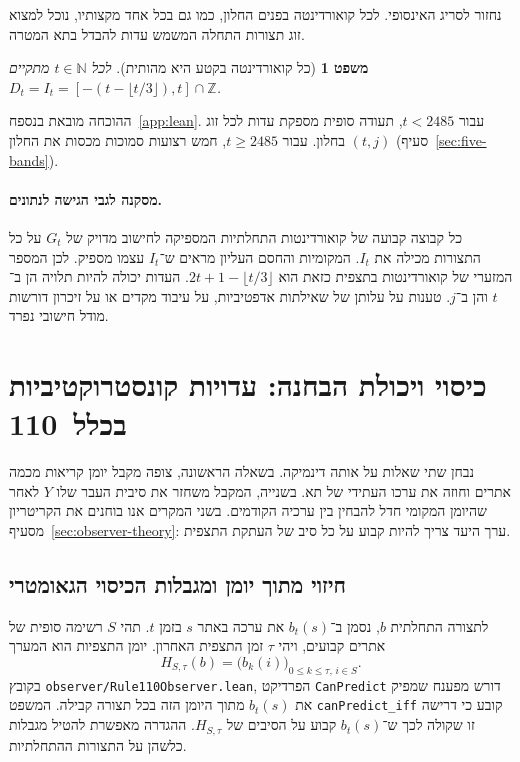 \documentclass[11pt,a4paper]{article}
\DeclareRobustCommand{\textenglish}[1]{\foreignlanguage{english}{#1}}
\newtheorem{theorem}{משפט}[section]
\theoremstyle{definition}
\begin{document}
נחזור לסריג האינסופי. לכל קואורדינטה בפנים החלון, כמו גם בכל אחד מקצותיו, נוכל למצוא זוג תצורות התחלה המשמש עדות להבדל בתא המטרה.

\begin{theorem}[כל קואורדינטה בקטע היא מהותית]\label{thm:gap-free}
לכל $t \in \mathbb{N}$ מתקיים $D_t = I_t = [-(t - \lfloor t/3 \rfloor), t] \cap \mathbb{Z}$.
\end{theorem}

ההוכחה מובאת בנספח~\ref{app:lean}. עבור $t<2485$, תעודה סופית מספקת עדות לכל זוג $(t,j)$ בחלון. עבור $t\ge2485$, חמש רצועות סמוכות מכסות את החלון (סעיף~\ref{sec:five-bands}).

\paragraph{מסקנה לגבי הגישה לנתונים.}
כל קבוצה קבועה של קואורדינטות התחלתיות המספיקה לחישוב מדויק של $G_t$ על כל התצורות מכילה את $I_t$. המקומיות והחסם העליון מראים ש־$I_t$ עצמו מספיק. לכן המספר המזערי של קואורדינטות בתצפית כזאת הוא $2t+1-\lfloor t/3\rfloor$. העדות יכולה להיות תלויה הן ב־$t$ והן ב־$j$. טענות על עלותן של שאילתות אדפטיביות, על עיבוד מקדים או על זיכרון דורשות מודל חישובי נפרד.

\section{כיסוי ויכולת הבחנה: עדויות קונסטרוקטיביות בכלל~110}
\label{sec:observer-witnesses}

נבחן שתי שאלות על אותה דינמיקה. בשאלה הראשונה, צופה מקבל יומן קריאות מכמה אתרים וחוזה את ערכו העתידי של תא. בשנייה, המקבל משחזר את סיבית העבר שלו $Y$ לאחר שהיומן המקומי חדל להבחין בין ערכיה הקודמים. בשני המקרים אנו בוחנים את הקריטריון מסעיף~\ref{sec:observer-theory}: ערך היעד צריך להיות קבוע על כל סיב של העתקת התצפית.

\subsection{חיזוי מתוך יומן ומגבלות הכיסוי הגאומטרי}
\label{sec:observer-coverage}

לתצורה התחלתית $b$, נסמן ב־$b_t(s)$ את ערכה באתר $s$ בזמן $t$. תהי $S$ רשימה סופית של אתרים קבועים, ויהי $\tau$ זמן התצפית האחרון. יומן התצפיות הוא המערך
\[
 H_{S,\tau}(b)=\bigl(b_k(i)\bigr)_{0\le k\le\tau,\,i\in S}.
\]
בקובץ \textenglish{\nolinkurl{observer/Rule110Observer.lean}}, הפרדיקט \textenglish{\texttt{CanPredict}} דורש מפענח שמפיק את $b_t(s)$ מתוך היומן הזה בכל תצורה קבילה. המשפט \textenglish{\texttt{canPredict\_iff}} קובע כי דרישה זו שקולה לכך ש־$b_t(s)$ קבוע על הסיבים של $H_{S,\tau}$. ההגדרה מאפשרת להטיל מגבלות כלשהן על התצורות ההתחלתיות.
\end{document}

